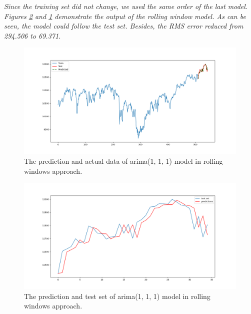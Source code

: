 \textit{Since the training set did not change, we used the same order of the last model. Figures \ref{fig:Ass2_Q2_Rolling_Forecast} and \ref{fig:Ass2_Q2_Rolling_Forecast_1} demonstrate the output of the rolling window model. As can be seen, the model could follow the test set. Besides, the RMS error reduced from 294.506 to 69.371.}

\begin{figure}[H]
    \centering
    \begin{minipage}[b]{1\textwidth}
        \includegraphics[width=\textwidth]{manuscript/src/figures/Ass2/Ass2_Q2_Rolling_Forecast_1.png}
    \end{minipage}
    \caption{The prediction and actual data of \gls{arima}(1, 1, 1) model in rolling windows approach.}
    \label{fig:Ass2_Q2_Rolling_Forecast_1}
\end{figure}

\begin{figure}[H]
    \centering
    \begin{minipage}[b]{1\textwidth}
        \includegraphics[width=\textwidth]{manuscript/src/figures/Ass2/Ass2_Q2_Rolling_Forecast.png}
    \end{minipage}
    \caption{The prediction and test set of \gls{arima}(1, 1, 1) model in rolling windows approach.}
    \label{fig:Ass2_Q2_Rolling_Forecast}
\end{figure}




